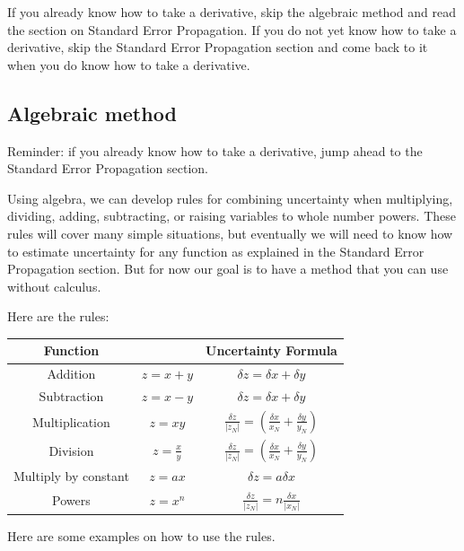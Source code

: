 \documentclass[twoside,11pt,ShortChapTitles]{BYUTextbook}
\begin{document}
If you already know how to take a derivative, skip the algebraic method and read the section on Standard Error Propagation.  If you do not yet know how to take a derivative, skip the Standard Error Propagation section and come back to it when you do know how to take a derivative.

\subsection{Algebraic method}
Reminder: if you already know how to take a derivative, jump ahead to the Standard Error Propagation section.


Using algebra, we can develop rules for combining uncertainty when multiplying, dividing, adding, subtracting, or raising variables to whole number powers. These rules will cover many simple situations, but eventually we will need to know how to estimate
uncertainty for any function as explained in the Standard Error Propagation section. But for now our goal is to have a
method that you can use without calculus.

Here are the rules:

\vspace{1 ex}

\begin{tabular}{ccc}
Function &  & Uncertainty Formula\\ \hline
Addition & $z=x+y$ & $\delta z=\delta x+\delta y$\\ \hline
Subtraction & $z=x-y$ & $\delta z=\delta x+\delta y$\\ \hline
Multiplication & $z=xy$ & $\frac{\delta z}{\left\vert z_{N}\right\vert
}=\left(  \frac{\delta x}{x_{N}}+\frac{\delta y}{y_{N}}\right)  $\\ \hline
Division & $z=\frac{x}{y}$ & $\frac{\delta z}{\left\vert z_{N}\right\vert
}=\left(  \frac{\delta x}{x_{N}}+\frac{\delta y}{y_{N}}\right)  $\\ \hline
Multiply by constant & $z=ax$ & $\delta z=a\delta x$\\ \hline
Powers & $z=x^{n}$ & $\frac{\delta z}{\left\vert z_{N}\right\vert }=n\frac{\delta x}{\left\vert x_{N}\right\vert }$\\ \hline
\end{tabular}

\vspace{1 ex}

Here are some examples on how to use the rules.
\end{document}
